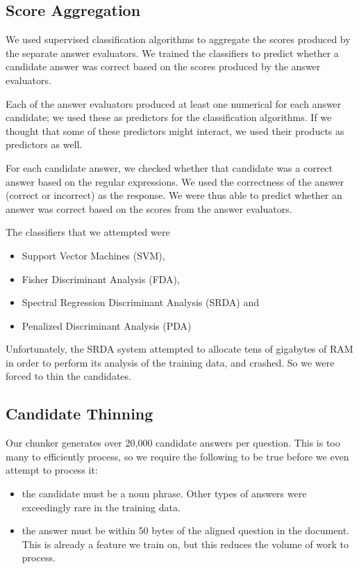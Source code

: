 \documentclass{article}
\begin{document}
\subsection{Score Aggregation}
We used supervised classification algorithms to aggregate the scores produced by
the separate answer evaluators. We trained the classifiers to predict whether a
candidate answer was correct based on the scores produced by the answer
evaluators.

Each of the answer evaluators produced at least one numerical for each answer
candidate; we used these as predictors for the classification algorithms.  If we
thought that some of these predictors might interact, we used their products as
predictors as well.

For each candidate answer, we checked whether that candidate was a correct
answer based on the regular expressions. We used the correctness of the answer
(correct or incorrect) as the response. We were thus able to predict whether an
answer was correct based on the scores from the answer evaluators.

The classifiers that we attempted were
\begin{itemize}
\item Support Vector Machines (SVM),
\item Fisher Discriminant Analysis (FDA),
\item Spectral Regression Discriminant Analysis (SRDA) and
\item Penalized Discriminant Analysis (PDA)
\end{itemize}

Unfortunately, the SRDA system attempted to allocate tens of gigabytes of RAM in
order to perform its analysis of the training data, and crashed.  So we were
forced to thin the candidates.

\subsection{Candidate Thinning}

Our chunker generates over 20,000 candidate answers per question.  This is too
many to efficiently process, so we require the following to be true before we
even attempt to process it:
\begin{itemize}
\item the candidate must be a noun phrase.  Other types of answers were
exceedingly rare in the training data.
\item the answer must be within 50 bytes of the aligned question in the
document.  This is already a feature we train on, but this reduces the volume of
work to process.
\end{itemize}
\end{document}
